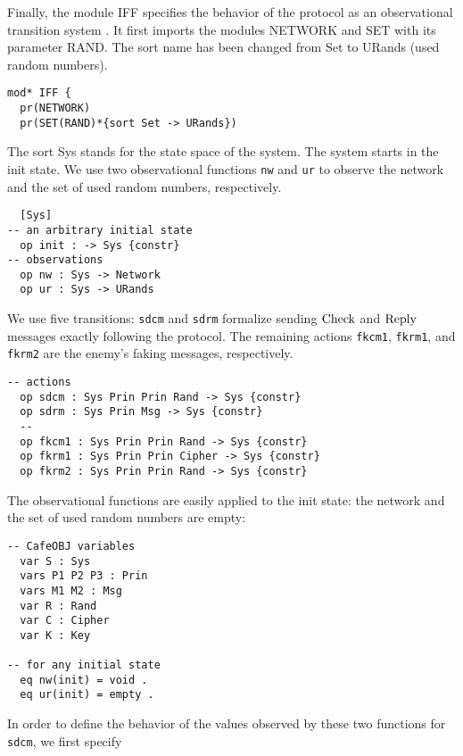 \documentclass[a4paper,fleqn]{cas-dc}
\begin{document}
Finally, the module IFF specifies the behavior of the protocol as an observational transition system \cite{OgataF03fmoods}. It first imports the modules NETWORK and SET with its parameter RAND. The sort name has been changed from Set to URands (used random numbers).
\begin{small}
\begin{verbatim}
mod* IFF {
  pr(NETWORK)
  pr(SET(RAND)*{sort Set -> URands})
\end{verbatim}
\end{small}  
The sort Sys stands for the state space of the system. The system starts in the init state. We use two observational functions \verb!nw! and \verb!ur! to observe the network and the set of used random numbers, respectively.
\begin{small}
\begin{verbatim}
  [Sys]
-- an arbitrary initial state
  op init : -> Sys {constr}
-- observations
  op nw : Sys -> Network
  op ur : Sys -> URands
\end{verbatim}
\end{small}  
We use five transitions: \verb!sdcm! and \verb!sdrm! formalize sending $\rm Check$ and $\rm Reply$ messages exactly following the protocol.
The remaining actions \verb!fkcm1!, \verb!fkrm1!, and \verb!fkrm2! are the enemy's faking messages, respectively.
\begin{small}
\begin{verbatim}
-- actions
  op sdcm : Sys Prin Prin Rand -> Sys {constr}
  op sdrm : Sys Prin Msg -> Sys {constr}
  --
  op fkcm1 : Sys Prin Prin Rand -> Sys {constr}
  op fkrm1 : Sys Prin Prin Cipher -> Sys {constr}
  op fkrm2 : Sys Prin Prin Rand -> Sys {constr}
\end{verbatim}
\end{small}
The observational functions are easily applied to the init state: the network and the set of used random numbers are empty:
\begin{small}
\begin{verbatim}
-- CafeOBJ variables
  var S : Sys
  vars P1 P2 P3 : Prin
  vars M1 M2 : Msg
  var R : Rand
  var C : Cipher
  var K : Key

-- for any initial state
  eq nw(init) = void .
  eq ur(init) = empty .
\end{verbatim}
\end{small}
In order to define the behavior of the values observed by these two functions for \verb!sdcm!, we first specify
\end{document}
